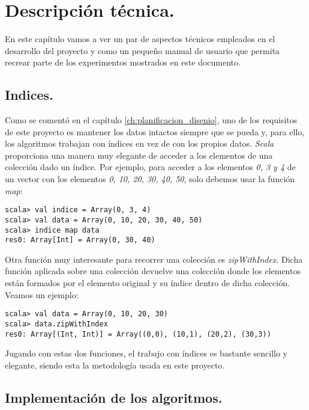 \chapter{Descripción técnica.} \label{ch:tecnica}

En este capítulo vamos a ver un par de aspectos técnicos empleados en el desarrollo del proyecto y como un pequeño manual de usuario que permita recrear parte de los experimentos mostrados en este documento. 

\section{Indices.} \label{sec:indices}

Como se comentó en el capítulo \ref{ch:planificacion_disenio}, uno de los requisitos de este proyecto es mantener los datos intactos siempre que se pueda y, para ello, los algoritmos trabajan con índices en vez de con los propios datos. \textit{Scala} proporciona una manera muy elegante de acceder a los elementos de una colección dado un índice. Por ejemplo, para acceder a los elementos \textit{0, 3 y 4} de un vector con los elementos \textit{0, 10, 20, 30, 40, 50}, solo debemos usar la función \textit{map}:

\begin{lstlisting}[frame=single, basicstyle=\scriptsize, breaklines=true]
scala> val indice = Array(0, 3, 4)
scala> val data = Array(0, 10, 20, 30, 40, 50)
scala> indice map data
res0: Array[Int] = Array(0, 30, 40)
\end{lstlisting} 

Otra función muy interesante para recorrer una colección es \textit{zipWithIndex}. Dicha función aplicada sobre una colección devuelve una colección donde los elementos están formados por el elemento original y su índice dentro de dicha colección. Veamos un ejemplo:

\begin{lstlisting}[frame=single, basicstyle=\scriptsize, breaklines=true]
scala> val data = Array(0, 10, 20, 30)
scala> data.zipWithIndex
res0: Array[(Int, Int)] = Array((0,0), (10,1), (20,2), (30,3))
\end{lstlisting} 

Jugando con estas dos funciones, el trabajo con índices es bastante sencillo y elegante, siendo esta la metodología usada en este proyecto.

\section{Implementación de los algoritmos.} \label{sec:implementacion_algoritmos}


